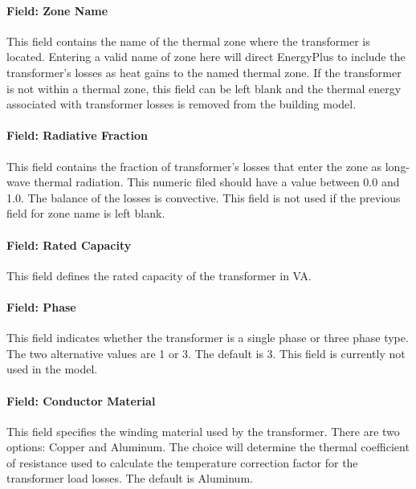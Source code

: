 \paragraph{Field: Zone Name}\label{field-zone-name-005}

This field contains the name of the thermal zone where the transformer is located. Entering a valid name of zone here will direct EnergyPlus to include the transformer's losses as heat gains to the named thermal zone. If the transformer is not within a thermal zone, this field can be left blank and the thermal energy associated with transformer losses is removed from the building model.

\paragraph{Field: Radiative Fraction}\label{field-radiative-fraction}

This field contains the fraction of transformer's losses that enter the zone as long-wave thermal radiation. This numeric filed should have a value between 0.0 and 1.0. The balance of the losses is convective. This field is not used if the previous field for zone name is left blank.

\paragraph{Field: Rated Capacity}\label{field-rated-capacity}

This field defines the rated capacity of the transformer in VA.

\paragraph{Field: Phase}\label{field-phase}

This field indicates whether the transformer is a single phase or three phase type. The two alternative values are 1 or 3. The default is 3. This field is currently not used in the model.

\paragraph{Field: Conductor Material}\label{field-conductor-material}

This field specifies the winding material used by the transformer. There are two options: Copper and Aluminum. The choice will determine the thermal coefficient of resistance used to calculate the temperature correction factor for the transformer load losses. The default is Aluminum.

